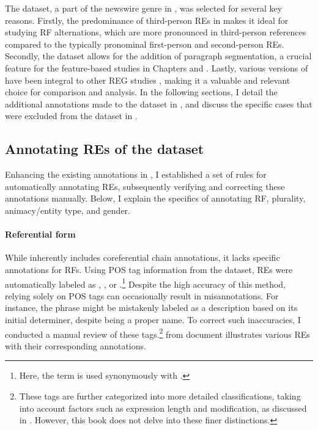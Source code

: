 The \wsj dataset, a part of the newswire genre in \onto, was selected for several key reasons. Firstly, the predominance of third-person REs in \wsj makes it ideal for studying RF alternations, which are more pronounced in third-person references compared to the typically pronominal first-person and second-person REs. Secondly, the dataset allows for the addition of paragraph segmentation, a crucial feature for the feature-based studies in Chapters \5 and \6. Lastly, various versions of \wsj have been integral to other REG studies \citep{orita2015discourse,kibrik2016referential,rosiger2018bashi}, making it a valuable and relevant choice for comparison and analysis. In the following sections, I detail the additional annotations made to the \wsj dataset in , and discuss the specific cases that were excluded from the dataset in . 



\subsection{Annotating REs of the \wsj dataset}\label{subsec:chap4wsjannotation}

Enhancing the existing annotations in \wsj, I established a set of rules for automatically annotating REs, subsequently verifying and correcting these annotations manually. Below, I explain the specifics of annotating RF, plurality, animacy/entity type, and gender.

\paragraph*{Referential form} 
While \wsj inherently includes coreferential chain annotations, it lacks specific annotations for RFs. Using POS tag information from the dataset, REs were automatically labeled as , , or .\footnote{Here, the term  is used synonymously with .} Despite the high accuracy of this method, relying solely on POS tags can occasionally result in misannotations. For instance, the phrase  might be mistakenly labeled as a description based on its initial determiner, despite being a proper name. To correct such inaccuracies, I conducted a manual review of these tags.\footnote{These tags are further categorized into more detailed classifications, taking into account factors such as expression length and modification, as discussed in \citep{belz2007generation}. However, this book does not delve into these finer distinctions.}  from document  illustrates various REs with their corresponding annotations.

